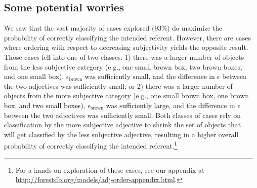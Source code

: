 \documentclass{sp}
\begin{document}
%




\subsection{Some potential worries}

We saw that the vast majority of cases explored (93\%) do maximize the probability of correctly classifying the intended referent. However, there are cases where ordering with respect to decreasing subjectivity yields the opposite result. Those cases %
fell into one of two classes: 1) there was a larger number of objects from the less subjective category (e.g., one small brown box, two brown boxes, and one small box), $\epsilon_{\textrm{brown}}$ was sufficiently small, and the difference in $\epsilon$ between the two adjectives was sufficiently small; or 2) there was a larger number of objects from the more subjective category (e.g., one small brown box, one brown box, and two small boxes), $\epsilon_{\textrm{brown}}$ was sufficiently large, and the difference in $\epsilon$ between the two adjectives was sufficiently small. Both classes of cases rely on classification by the more subjective adjective to shrink the set of objects that will get classified by the less subjective adjective, resulting in a higher overall probability of correctly classifying the intended referent.\footnote{For a hands-on exploration of these cases, see our appendix at \href{http://forestdb.org/models/adj-order-appendix.html}{http://forestdb.org/models/adj-order-appendix.html}.}
\end{document}
